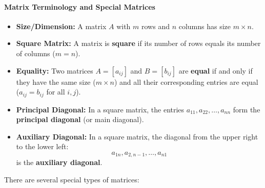 \paragraph{Matrix Terminology and Special Matrices}

\begin{itemize}
    \item \textbf{Size/Dimension:} A matrix $A$ with $m$ rows and $n$ columns has size $m \times n$.
    \item \textbf{Square Matrix:} A matrix is \textbf{square} if its number of rows equals its number of columns ($m=n$).
    \item \textbf{Equality:} Two matrices $A = [a_{ij}]$ and $B = [b_{ij}]$ are \textbf{equal} if and only if they have the same size ($m \times n$) and all their corresponding entries are equal ($a_{ij} = b_{ij}$ for all $i, j$).
    \item \textbf{Principal Diagonal:} In a square matrix, the entries $a_{11}, a_{22}, \ldots, a_{nn}$ form the \textbf{principal diagonal} (or main diagonal).
    \item \textbf{Auxiliary Diagonal:} In a square matrix, the diagonal from the upper right to the lower left:
    $$a_{1n}, a_{2,n-1}, \ldots, a_{n1}$$ is the \textbf{auxiliary diagonal}.
\end{itemize}

There are several special types of matrices:

% 

